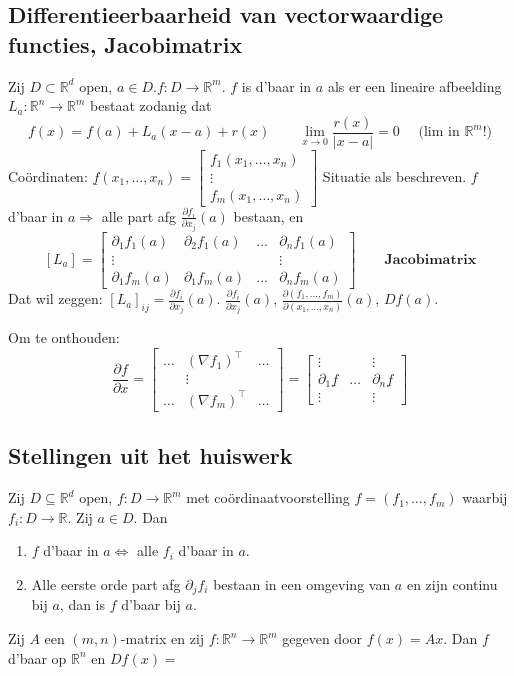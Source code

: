 \documentclass[a4paper]{exam}
\theoremstyle{definition}
\begin{document}
		\subsection{Differentieerbaarheid van vectorwaardige functies, Jacobimatrix}
			Zij $D \subset \mathbb{R}^d$ open, $a \in D. f: D \rightarrow \mathbb{R}^m$. $f$ is d'baar in $a$ als er een lineaire afbeelding $L_a :\mathbb{R}^n \rightarrow \mathbb{R}^m$ bestaat zodanig dat \[f(x)=f(a)+L_a (x-a) + r(x) \qquad \lim_{x \rightarrow 0} \frac{r(x)}{|x-a|} =0 \quad\text{ (lim in } \mathbb{R}^m \text{!)}\]
			Co\"ordinaten: $\underline{f}(x_1,\dots ,x_n)=\begin{bmatrix}
				f_1 (x_1, \dots ,x_n) \\
				\vdots \\
				f_m (x_1, \dots ,x_n)
			\end{bmatrix}$
			\theorem[en definitie] Situatie als beschreven. $f$ d'baar in $a \Rightarrow$ alle part afg $\frac{\partial f_i}{\partial x_j}(a)$ bestaan, en
			\[[L_a] = \begin{bmatrix}
				\partial_1 f_1 (a) & \partial_2 f_1 (a) & \dots &\partial_n f_1 (a) \\
				\vdots & & & \vdots \\
				\partial_1 f_m (a) & \partial_1 f_m (a) & \dots &\partial_n f_m (a)
			\end{bmatrix} \qquad \textbf{Jacobimatrix}\]
			Dat wil zeggen: $[L_a]_{ij}=\frac{\partial f_i}{\partial x_j}(a)$.
			\nota $\frac{\partial f_i}{\partial x_j}(a)$, $\frac{\partial (f_1,\dots,f_m)}{\partial (x_1,\dots,x_n)}(a)$, $ Df(a) $.
			
			Om te onthouden:
			\[ \frac{\partial f}{\partial x} = \begin{bmatrix}
			\dots & (\nabla f_1)^\top & \dots \\
			& \vdots & \\
			\dots & (\nabla f_m)^\top & \dots
			\end{bmatrix} =
			\begin{bmatrix}
			\vdots & & \vdots \\
			\partial_1 \underline{f} & \dots & \partial_n \underline{f} \\
			\vdots & & \vdots
			\end{bmatrix}\]
		\subsection{Stellingen uit het huiswerk}
			\theorem Zij $ D \subseteq \mathbb{R}^d $ open, $ f: D \rightarrow \mathbb{R}^m $ met co\"ordinaatvoorstelling $ f=(f_1,\dots,f_m) $ waarbij $ f_i : D \rightarrow \mathbb{R} $. Zij $ a \in D $. Dan
			\begin{enumerate}[(1)]
				\item $ f $ d'baar in $ a \Leftrightarrow $ alle $ f_i $ d'baar in $ a $.
				\item Alle eerste orde part afg $ \partial_j f_i $ bestaan in een omgeving van $ a $ en zijn continu bij $ a $, dan is $ f $ d'baar bij $ a $.
			\end{enumerate}
			\theorem Zij $ A $ een $ (m,n) $-matrix en zij $ f:\mathbb{R}^n \rightarrow \mathbb{R}^m $ gegeven door $ f(x)=Ax $. Dan $ f $ d'baar op $ \mathbb{R}^n $ en $ Df(x) =  $ %
			
\end{document}
